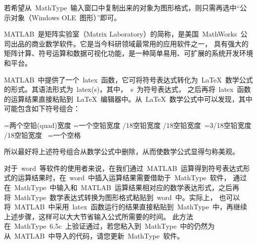 若希望从~MathType~输入窗口中复制出来的对象为图形格式，则只需再选中“公示对象（Windows OLE~图形）”即可。

MATLAB~是矩阵实验室（Matrix Laboratory）的简称，是美国~MathWorks~公司出品的商业数学软件。它是当今科研领域最常用的应用软件之一，
具有强大的矩阵计算、符号运算和数据可视化功能，是一种简单易用、可扩展的系统开发环境和平台。

MATLAB~中提供了一个~latex~函数，它可将符号表达式转化为~\LaTeX~数学公式的形式。其语法形式为~latex(s)，其中，~s~为符号表达式，
之后再将~latex~函数的运算结果直接粘贴到~\LaTeX~编辑器中。从~\LaTeX~数学公式中可以发现，其中可能包含如下符号组合：
\begin{verbatim*}
\qquad=两个空铅(quad)宽度
\quad=一个空铅宽度
/18空铅宽度
/18空铅宽度
\,=3/18空铅宽度
/18空铅宽度
\ =一个空格
\end{verbatim*}
所以最好将上述符号组合从数学公式中删除，从而使数学公式显得匀称美观。

对于~word~等软件的使用者来说，在我们通过~MATLAB~运算得到符号表达式形式的运算结果时，在~word~中插入运算结果需要借助于~MathType~软件，
通过在~MathType~中输入和~MATLAB~运算结果相对应的数学表达形式，之后再将~MathType~数学表达式转换为图形格式粘贴到~word~中。实际上，
也可以将~MATLAB~中采用~latex~函数运行的结果直接粘贴到~MathType~中，再继续上述步骤，这样可以大大节省输入公式所需要的时间。
此方法在~MathType~6.5c~上验证通过，若您粘入到~MathType~中的仍然为从~MATLAB~中导入的代码，请您更新~MathType~软件。

